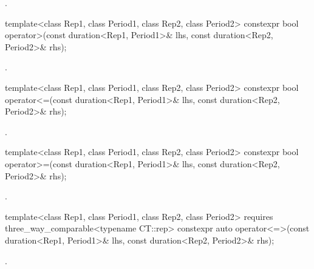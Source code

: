 \begin{itemdescr}
\pnum
\returns
{}.
\end{itemdescr}

%
\begin{itemdecl}
template<class Rep1, class Period1, class Rep2, class Period2>
  constexpr bool operator>(const duration<Rep1, Period1>& lhs,
                           const duration<Rep2, Period2>& rhs);
\end{itemdecl}

\begin{itemdescr}
\pnum
\returns
{}.
\end{itemdescr}

%
\begin{itemdecl}
template<class Rep1, class Period1, class Rep2, class Period2>
  constexpr bool operator<=(const duration<Rep1, Period1>& lhs,
                            const duration<Rep2, Period2>& rhs);
\end{itemdecl}

\begin{itemdescr}
\pnum
\returns
{}.
\end{itemdescr}

%
\begin{itemdecl}
template<class Rep1, class Period1, class Rep2, class Period2>
  constexpr bool operator>=(const duration<Rep1, Period1>& lhs,
                            const duration<Rep2, Period2>& rhs);
\end{itemdecl}

\begin{itemdescr}
\pnum
\returns
{}.
\end{itemdescr}

%
\begin{itemdecl}
template<class Rep1, class Period1, class Rep2, class Period2>
    requires three_way_comparable<typename CT::rep>
  constexpr auto operator<=>(const duration<Rep1, Period1>& lhs,
                             const duration<Rep2, Period2>& rhs);
\end{itemdecl}

\begin{itemdescr}
\pnum
\returns
{}.
\end{itemdescr}

